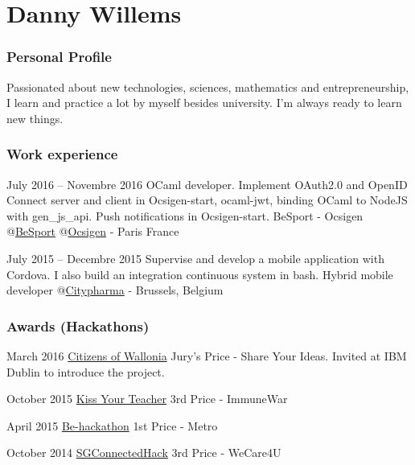\documentclass[fontsize=10pt]{tccv}
\begin{document}
\part{Danny Willems}

\section{Personal Profile}

Passionated about new technologies, sciences, mathematics and entrepreneurship,
I learn and practice a lot by myself besides university. I'm always ready to
learn new things.

\section{Work experience}

\begin{eventlist}

\item{July 2016 -- Novembre 2016}
	{OCaml developer. Implement OAuth2.0 and OpenID Connect server and client in
	Ocsigen-start, ocaml-jwt, binding OCaml to NodeJS with gen\_js\_api. Push
notifications in Ocsigen-start.}
	{BeSport - Ocsigen}
	@\href{https://besport.com}{BeSport}
	@\href{https://ocsigen.org}{Ocsigen} - Paris France


\item{July 2015 -- Decembre 2015}
	{Supervise and develop a mobile application with Cordova. I also build an
	integration continuous system in bash.}
	 {Hybrid mobile developer} @\href{http://selfpharma.be}{Citypharma} -
	 Brussels, Belgium

\end{eventlist}

\section{Awards (Hackathons)}

\begin{yearlist}
	\item{March 2016}
		{\href{http://citizensofwallonia.be}{Citizens of Wallonia}}
		{Jury's Price - Share Your Ideas. Invited at IBM Dublin to introduce the
		project.}
	\item{October 2015}
		{\href{http://www.kissyourteacher.be/}{Kiss Your Teacher}}
		{3rd Price - ImmuneWar}
	\item{April 2015}
		{\href{http://www.be-hackathon.be/?lang=fr}{Be-hackathon}}
		{1st Price - Metro}
	\item{October 2014}
		{\href{http://sgconnectedhack.bemyapp.com/}{SGConnectedHack}}
		{3rd Price - WeCare4U}
\end{yearlist}
\end{document}
